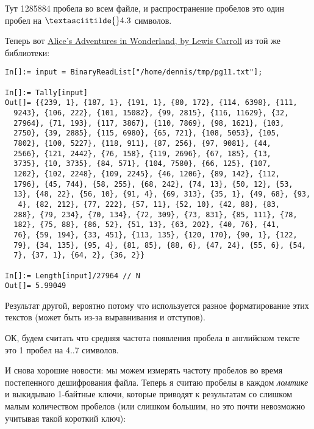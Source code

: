 Тут 1285884 пробела во всем файле, и распространение пробелов это один пробел на $\textasciitilde{}4.3$ символов.

Теперь вот \href{http://www.gutenberg.org/ebooks/11}{Alice's Adventures in Wonderland, by Lewis Carroll} из той же библиотеки:

\begin{lstlisting}[caption=Mathematica,style=custommath]
In[]:= input = BinaryReadList["/home/dennis/tmp/pg11.txt"];

In[]:= Tally[input]
Out[]= {{239, 1}, {187, 1}, {191, 1}, {80, 172}, {114, 6398}, {111, 
  9243}, {106, 222}, {101, 15082}, {99, 2815}, {116, 11629}, {32, 
  27964}, {71, 193}, {117, 3867}, {110, 7869}, {98, 1621}, {103, 
  2750}, {39, 2885}, {115, 6980}, {65, 721}, {108, 5053}, {105, 
  7802}, {100, 5227}, {118, 911}, {87, 256}, {97, 9081}, {44, 
  2566}, {121, 2442}, {76, 158}, {119, 2696}, {67, 185}, {13, 
  3735}, {10, 3735}, {84, 571}, {104, 7580}, {66, 125}, {107, 
  1202}, {102, 2248}, {109, 2245}, {46, 1206}, {89, 142}, {112, 
  1796}, {45, 744}, {58, 255}, {68, 242}, {74, 13}, {50, 12}, {53, 
  13}, {48, 22}, {56, 10}, {91, 4}, {69, 313}, {35, 1}, {49, 68}, {93,
   4}, {82, 212}, {77, 222}, {57, 11}, {52, 10}, {42, 88}, {83, 
  288}, {79, 234}, {70, 134}, {72, 309}, {73, 831}, {85, 111}, {78, 
  182}, {75, 88}, {86, 52}, {51, 13}, {63, 202}, {40, 76}, {41, 
  76}, {59, 194}, {33, 451}, {113, 135}, {120, 170}, {90, 1}, {122, 
  79}, {34, 135}, {95, 4}, {81, 85}, {88, 6}, {47, 24}, {55, 6}, {54, 
  7}, {37, 1}, {64, 2}, {36, 2}}

In[]:= Length[input]/27964 // N
Out[]= 5.99049
\end{lstlisting}

Результат другой, вероятно потому что используется разное форматирование этих текстов (может быть из-за выравнивания
и отступов).

ОК, будем считать что средняя частота появления пробела в английском тексте это 1 пробел на 4..7 символов.

И снова хорошие новости: мы можем измерять частоту пробелов во время постепенного дешифрования файла.
Теперь я считаю пробелы в каждом \emph{ломтике} и выкидываю 1-байтные ключи, которые приводят к результатам со слишком
малым количеством пробелов
(или слишком большим, но это почти невозможно учитывая такой короткий ключ):

